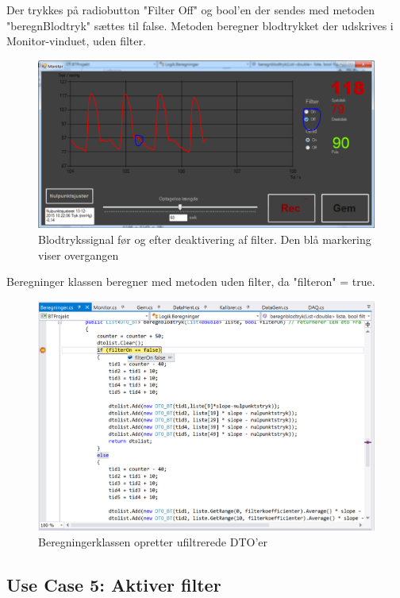 Der trykkes på radiobutton "Filter Off" og bool'en der sendes med metoden "beregnBlodtryk" sættes til false. Metoden beregner blodtrykket der udskrives i Monitor-vinduet, uden filter.

\begin{figure}[H]
	\centering
	\includegraphics[width=1\textwidth]{Figurer/Test_Deaktiver_3}
	\caption{Blodtrykssignal før og efter deaktivering af filter. Den blå markering viser overgangen}
\end{figure}

Beregninger klassen beregner med metoden uden filter, da "filteron" = true.

\begin{figure}[H]
	\centering
	\includegraphics[width=1\textwidth]{Figurer/Test_Deaktiver_4}
	\caption{Beregningerklassen opretter ufiltrerede DTO'er}
\end{figure}

\subsection{Use Case 5: Aktiver filter}


